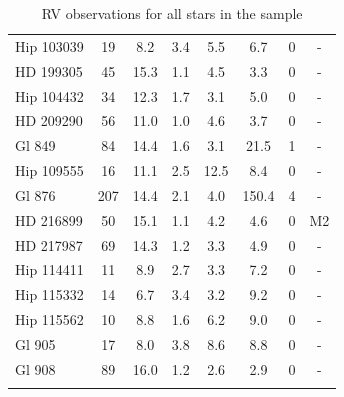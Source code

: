 \begin{landscape}
{\begin{longtable}{l|ccccccc}
Hip 103039  &  19 &   8.2 &   3.4 &   5.5 &   6.7 & 0 & -  \\ 
HD 199305  &  45 &  15.3 &   1.1 &   4.5 &   3.3 & 0 & -  \\ 
Hip 104432  &  34 &  12.3 &   1.7 &   3.1 &   5.0 & 0 & -  \\ 
HD 209290  &  56 &  11.0 &   1.0 &   4.6 &   3.7 & 0 & -  \\ 
Gl 849 &  84 &  14.4 &   1.6 &   3.1 &  21.5 & 1 & -  \\ 
Hip 109555  &  16 &  11.1 &   2.5 &  12.5 &   8.4 & 0 & -  \\ 
Gl 876 & 207 &  14.4 &   2.1 &   4.0 & 150.4 & 4 & -  \\ 
HD 216899 &  50 &  15.1 &   1.1 &   4.2 &   4.6 & 0 & M2 \citep{Zakhozhaj02}  \\ 
HD 217987  &  69 &  14.3 &   1.2 &   3.3 &   4.9 & 0 & -  \\ 
Hip 114411  &  11 &   8.9 &   2.7 &   3.3 &   7.2 & 0 & -  \\ 
Hip 115332  &  14 &   6.7 &   3.4 &   3.2 &   9.2 & 0 & -  \\ 
Hip 115562  &  10 &   8.8 &   1.6 &   6.2 &   9.0 & 0 & -  \\ 
Gl 905  &  17 &   8.0 &   3.8 &  8.6 &   8.8 & 0 & -  \\ 
Gl 908  &  89 &  16.0 &   1.2 &   2.6 &   2.9 & 0 & -  \\ 
\hline
\caption{RV observations for all stars in the sample}
\label{T1b}
\end{longtable}
}
\end{landscape}
\clearpage

